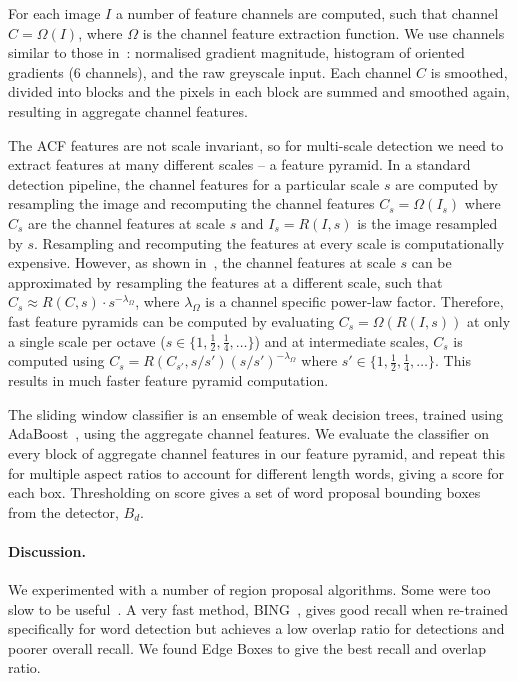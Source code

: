 \documentclass[twocolumn]{svjour3}          \smartqed  \usepackage{epsfig}
\begin{document}
For each image $I$ a number of feature channels are computed, such that channel $C = \Omega(I)$, where $\Omega$ is the channel feature extraction function. We use channels similar to those in~\cite{Dollar10}: normalised gradient magnitude, histogram of oriented gradients (6 channels), and the raw greyscale input. Each channel $C$ is smoothed, divided into blocks and the pixels in each block are summed and smoothed again, resulting in aggregate channel features. 

The ACF features are not scale invariant, so for multi-scale detection we need to extract features at many different scales -- a feature pyramid. In a standard detection pipeline, the channel features for a particular scale $s$ are computed by resampling the image and recomputing the channel features $C_s = \Omega(I_s)$ where $C_s$ are the channel features at scale $s$ and $I_s = R(I,s)$ is the image resampled by $s$. Resampling and recomputing the features at every scale is computationally expensive. However, as shown in~\cite{Dollar10,Dollar14}, the channel features at scale $s$ can be approximated by resampling the features at a different scale, such that $C_s \approx R(C,s) \cdot s^{-\lambda_\Omega}$, where $\lambda_\Omega$ is a channel specific power-law factor. Therefore, fast feature pyramids can be computed by evaluating $C_s = \Omega(R(I,s))$ at only a single scale per octave ($s \in \{1, \frac{1}{2}, \frac{1}{4}, \dots\}$) and at intermediate scales, $C_s$ is computed using $C_s = R(C_{s'},s/s')(s/s')^{-\lambda_\Omega}$ where $s' \in \{1, \frac{1}{2}, \frac{1}{4}, \dots\}$. This results in much faster feature pyramid computation.

The sliding window classifier is an ensemble of weak decision trees, trained using AdaBoost~\cite{Friedman00}, using the aggregate channel features. We evaluate the classifier on every block of aggregate channel features in our feature pyramid, and repeat this for multiple aspect ratios to account for different length words, giving a score for each box. Thresholding on score gives a set of word proposal bounding boxes from the detector, $B_d$.

\paragraph{Discussion.}
We experimented with a number of region proposal algorithms. Some were too slow to be useful~\cite{Uijlings13,Alexe12}. A very fast method, BING~\cite{Cheng14}, gives good recall when re-trained specifically for word detection but achieves a low overlap ratio for detections and poorer overall recall. We found Edge Boxes to give the best recall and overlap ratio.
\end{document}
